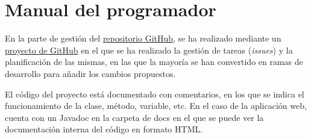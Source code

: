 \section{Manual del programador}
\label{sec:manual-programador}

En la parte de gestión del \href{https://github.com/CesarRodrigu/GII-24.19-contramedidas-IoT-mediante-reinforcement-learning}{repositorio GitHub}, se ha realizado mediante un \href{https://github.com/users/CesarRodrigu/projects/6}{proyecto de GitHub} en el que se ha realizado la gestión de tareas (\textit{issues}) y la planificación de las mismas, en las que la mayoría se han convertido en ramas de desarrollo para añadir los cambios propuestos.

El código del proyecto está documentado con comentarios, en los que se indica el funcionamiento de la clase, método, variable, etc. En el caso de la aplicación web, cuenta con un Javadoc en la carpeta de docs en el que se puede ver la documentación interna del código en formato HTML.

